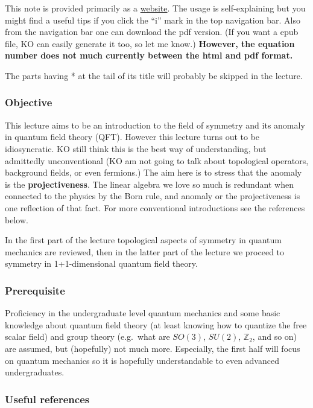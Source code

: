 \documentclass[
]{scrartcl}
\numberwithin{equation}{section}
\theoremstyle{definition}
\theoremstyle{definition}
\theoremstyle{definition}
\theoremstyle{definition}
\theoremstyle{remark}
\begin{document}
This note is provided primarily as a \href{https://kantohm11.github.io/symmetry_review/}{website}.
The usage is self-explaining but you might find a useful tips if you click the ``i'' mark in the top navigation bar. Also from the navigation bar one can download the pdf version. (If you want a epub file, KO can easily generate it too, so let me know.) \textbf{However, the equation number does not much currently between the html and pdf format.}

The parts having * at the tail of its title will probably be skipped in the lecture.

\hypertarget{objective}{%
\subsubsection{Objective}\label{objective}}

This lecture aims to be an introduction to the field of symmetry and its anomaly in quantum field theory (QFT). However this lecture turns out to be idiosyncratic. KO still think this is the best way of understanding, but admittedly unconventional (KO am not going to talk about topological operators, background fields, or even fermions.)
The aim here is to stress that the anomaly is the \textbf{projectiveness}.
The linear algebra we love so much is redundant when connected to the physics by the Born rule, and anomaly or the projectiveness is one reflection of that fact.
For more conventional introductions see the references below.

In the first part of the lecture topological aspects of symmetry in quantum mechanics are reviewed, then in the latter part of the lecture we proceed to symmetry in 1+1-dimensional quantum field theory.

\hypertarget{prerequisite}{%
\subsubsection{Prerequisite}\label{prerequisite}}

Proficiency in the undergraduate level quantum mechanics and some basic knowledge about quantum field theory (at least knowing how to quantize the free scalar field) and group theory (e.g.~what are \(SO(3)\), \(SU(2)\), \(\mathbb{Z}_2\), and so on) are assumed, but (hopefully) not much more. Especially, the first half will focus on quantum mechanics so it is hopefully understandable to even advanced undergraduates.

\hypertarget{othernotes}{%
\subsubsection{Useful references}\label{othernotes}}
\end{document}
